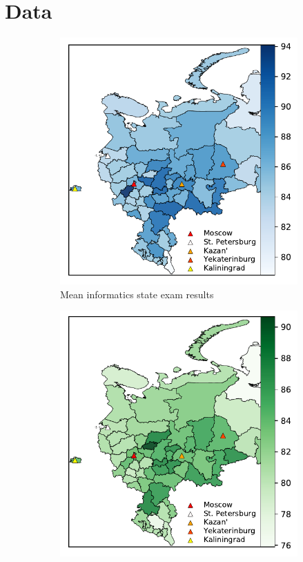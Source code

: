 \documentclass{article}
\begin{document}
\section{Data}
\begin{figure}[htb]
  \centering 
  \begin{subfigure}{0.49\textwidth}
    \includegraphics[width=\linewidth]{../gfx/map_informatics.pdf}
    \caption{Mean informatics state exam results}
    \label{fig:detection2d}
  \end{subfigure} 
  \begin{subfigure}{0.49\textwidth}
    \includegraphics[width=\linewidth]{../gfx/map_math.pdf}

\end{subfigure}
\end{figure}
\end{document}
